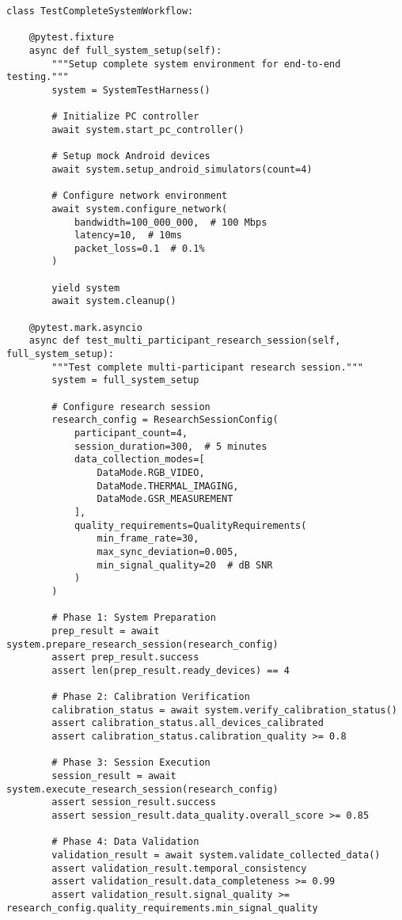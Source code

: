 \documentclass[12pt,a4paper]{report}
\begin{document}
\begin{verbatim}
class TestCompleteSystemWorkflow:

    @pytest.fixture
    async def full_system_setup(self):
        """Setup complete system environment for end-to-end testing."""
        system = SystemTestHarness()

        # Initialize PC controller
        await system.start_pc_controller()

        # Setup mock Android devices
        await system.setup_android_simulators(count=4)

        # Configure network environment
        await system.configure_network(
            bandwidth=100_000_000,  # 100 Mbps
            latency=10,  # 10ms
            packet_loss=0.1  # 0.1%
        )

        yield system
        await system.cleanup()

    @pytest.mark.asyncio
    async def test_multi_participant_research_session(self, full_system_setup):
        """Test complete multi-participant research session."""
        system = full_system_setup

        # Configure research session
        research_config = ResearchSessionConfig(
            participant_count=4,
            session_duration=300,  # 5 minutes
            data_collection_modes=[
                DataMode.RGB_VIDEO,
                DataMode.THERMAL_IMAGING,
                DataMode.GSR_MEASUREMENT
            ],
            quality_requirements=QualityRequirements(
                min_frame_rate=30,
                max_sync_deviation=0.005,
                min_signal_quality=20  # dB SNR
            )
        )

        # Phase 1: System Preparation
        prep_result = await system.prepare_research_session(research_config)
        assert prep_result.success
        assert len(prep_result.ready_devices) == 4

        # Phase 2: Calibration Verification
        calibration_status = await system.verify_calibration_status()
        assert calibration_status.all_devices_calibrated
        assert calibration_status.calibration_quality >= 0.8

        # Phase 3: Session Execution
        session_result = await system.execute_research_session(research_config)
        assert session_result.success
        assert session_result.data_quality.overall_score >= 0.85

        # Phase 4: Data Validation
        validation_result = await system.validate_collected_data()
        assert validation_result.temporal_consistency
        assert validation_result.data_completeness >= 0.99
        assert validation_result.signal_quality >= research_config.quality_requirements.min_signal_quality


\end{verbatim}
\end{document}
